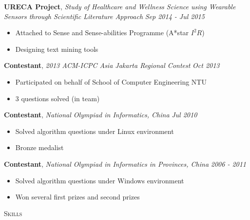 \documentclass[a4paper]{article}
\newenvironment{changemargin}[2]{%
  \begin{list}{}{%
      \setlength{\topsep}{0pt}%
      \setlength{\leftmargin}{#1}%
      \setlength{\rightmargin}{#2}%
      \setlength{\listparindent}{\parindent}%
      \setlength{\itemindent}{\parindent}%
      \setlength{\parsep}{\parskip}%
    }%
  \item[]}{\end{list}
}
\newcommand{\lineover}{
  \begin{changemargin}{-0.05in}{-0.05in}
    \vspace*{-8pt}
    \hrulefill \\
    \vspace*{-2pt}
  \end{changemargin}
}
\newcommand{\header}[1]{
  \begin{changemargin}{-0.5in}{-0.5in}
    \scshape{#1}\\
    \lineover
  \end{changemargin}
}
\newenvironment{body}
{
\vspace*{-16pt}
\begin{changemargin}{-0.25in}{-0.5in}
}	
{
\end{changemargin}
}
\begin{document}
\begin{body}
  \vspace{14pt}

  \textbf{URECA Project}, \emph{Study of Healthcare and Wellness Science using Wearable Sensors through Scientific Literature Approach} \hfill \emph{Sep 2014 - Jul 2015}\\
  \vspace*{-4pt}
  \begin{itemize} \itemsep -0pt  %
  \item Attached to Sense and Sense-abilities Programme (A*star $I^{2}R$)
  \item Designing text mining tools
  \end{itemize}

  \textbf{Contestant}, \emph{2013 ACM-ICPC Asia Jakarta Regional Contest} \hfill \emph{Oct 2013}\\
  \vspace*{-4pt}
  \begin{itemize} \itemsep -0pt  %
  \item Participated on behalf of School of Computer Engineering NTU
  \item 3 questions solved (in team)
  \end{itemize}
  
  \textbf {Contestant}, \emph{National Olympiad in Informatics, China} \hfill \emph{Jul 2010}\\
  \vspace*{-4pt}
  \begin{itemize} \itemsep -0pt
  \item Solved algorithm questions under Linux environment
  \item Bronze medalist
  \end{itemize}

  \textbf {Contestant}, \emph{National Olympiad in Informatics in Provinces, China} \hfill \emph{2006 - 2011}\\
  \vspace*{-4pt}
  \begin{itemize} \itemsep -0pt
  \item Solved algorithm questions under Windows environment
  \item Won several first prizes and second prizes
  \end{itemize}
\end{body}

\smallskip

%
%
%
%
\header{Skills}
\end{document}
